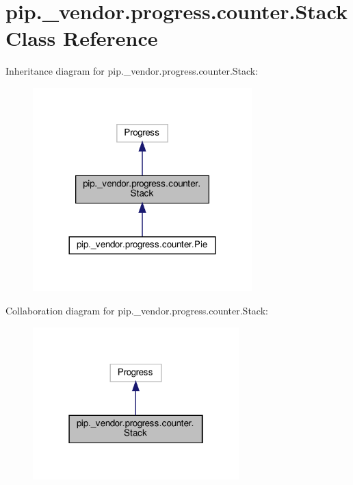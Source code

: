 \hypertarget{classpip_1_1__vendor_1_1progress_1_1counter_1_1Stack}{}\section{pip.\+\_\+vendor.\+progress.\+counter.\+Stack Class Reference}
\label{classpip_1_1__vendor_1_1progress_1_1counter_1_1Stack}


Inheritance diagram for pip.\+\_\+vendor.\+progress.\+counter.\+Stack\+:
\nopagebreak
\begin{figure}[H]
\begin{center}
\leavevmode
\includegraphics[width=240pt]{classpip_1_1__vendor_1_1progress_1_1counter_1_1Stack__inherit__graph}
\end{center}
\end{figure}


Collaboration diagram for pip.\+\_\+vendor.\+progress.\+counter.\+Stack\+:
\nopagebreak
\begin{figure}[H]
\begin{center}
\leavevmode
\includegraphics[width=226pt]{classpip_1_1__vendor_1_1progress_1_1counter_1_1Stack__coll__graph}
\end{center}
\end{figure}
